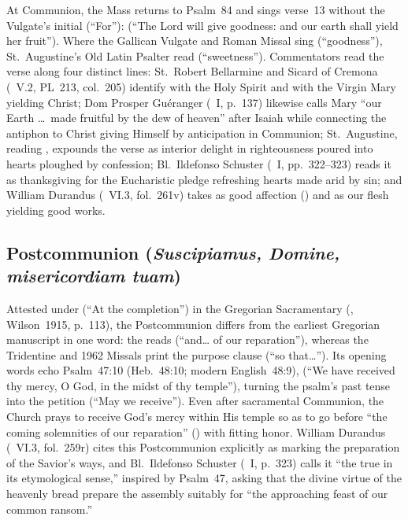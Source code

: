 At Communion, the Mass returns to Psalm~84 and sings verse~13 without the Vulgate's initial  (``For''):  (``The Lord will give goodness: and our earth shall yield her fruit''). Where the Gallican Vulgate and Roman Missal sing  (``goodness''), St.~Augustine's Old Latin Psalter read  (``sweetness''). Commentators read the verse along four distinct lines: St.~Robert Bellarmine and Sicard of Cremona (~V.2, PL~213, col.~205) identify  with the Holy Spirit and  with the Virgin Mary yielding Christ; Dom Prosper Gu\'eranger (~I, p.~137) likewise calls Mary ``our Earth \dots\ made fruitful by the dew of heaven'' after Isaiah while connecting the antiphon to Christ giving Himself by anticipation in Communion; St.~Augustine, reading , expounds the verse as interior delight in righteousness poured into hearts ploughed by confession; Bl.~Ildefonso Schuster (~I, pp.~322--323) reads it as thanksgiving for the Eucharistic pledge refreshing hearts made arid by sin; and William Durandus (~VI.3, fol.~261v) takes  as good affection () and  as our flesh yielding good works.

\subsection{Postcommunion (\textit{Suscipiamus, Domine, misericordiam tuam})}

Attested under  (``At the completion'') in the Gregorian Sacramentary (, Wilson~1915, p.~113), the Postcommunion differs from the earliest Gregorian manuscript in one word: the  reads  (``and\dots{} of our reparation''), whereas the Tridentine and 1962 Missals print the purpose clause  (``so that\dots''). Its opening words echo Psalm~47:10 (Heb.~48:10; modern English~48:9),  (``We have received thy mercy, O God, in the midst of thy temple''), turning the psalm's past tense into the petition  (``May we receive''). Even after sacramental Communion, the Church prays to receive God's mercy within His temple so as to go before ``the coming solemnities of our reparation'' () with fitting honor. William Durandus (~VI.3, fol.~259r) cites this Postcommunion explicitly as marking the preparation of the Savior's ways, and Bl.~Ildefonso Schuster (~I, p.~323) calls it ``the true  in its etymological sense,'' inspired by Psalm~47, asking that the divine virtue of the heavenly bread prepare the assembly suitably for ``the approaching feast of our common ransom.''

